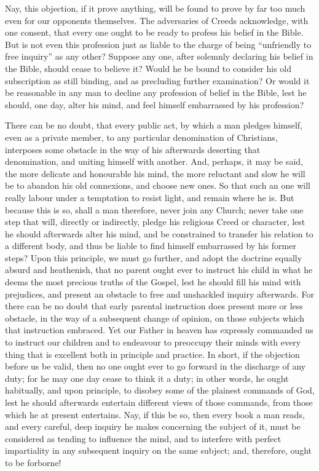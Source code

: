 \documentclass[
]{book}
\begin{document}
Nay, this objection, if it prove anything, will be found to prove by far too much even for our opponents themselves. The adversaries of Creeds acknowledge, with one consent, that every one ought to be ready to profess his belief in the Bible. But is not even this profession just as liable to the charge of being ``unfriendly to free inquiry'' as any other? Suppose any one, after solemnly declaring his belief in the Bible, should cease to believe it? Would he be bound to consider his old subscription as still binding, and as precluding further examination? Or would it be reasonable in any man to decline any profession of belief in the Bible, lest he should, one day, alter his mind, and feel himself embarrassed by his profession?

There can be no doubt, that every public act, by which a man pledges himself, even as a private member, to any particular denomination of Christians, interposes some obstacle in the way of his afterwards deserting that denomination, and uniting himself with another. And, perhaps, it may be said, the more delicate and honourable his mind, the more reluctant and slow he will be to abandon his old connexions, and choose new ones. So that such an one will really labour under a temptation to resist light, and remain where he is. But because this is so, shall a man therefore, never join any Church; never take one step that will, directly or indirectly, pledge his religious Creed or character, lest he should afterwards alter his mind, and be constrained to transfer his relation to a different body, and thus be liable to find himself embarrassed by his former steps? Upon this principle, we must go further, and adopt the doctrine equally absurd and heathenish, that no parent ought ever to instruct his child in what he deems the most precious truths of the Gospel, lest he should fill his mind with prejudices, and present an obstacle to free and unshackled inquiry afterwards. For there can be no doubt that early parental instruction does present more or less obstacle, in the way of a subsequent change of opinion, on those subjects which that instruction embraced. Yet our Father in heaven has expressly commanded us to instruct our children and to endeavour to preoccupy their minds with every thing that is excellent both in principle and practice. In short, if the objection before us be valid, then no one ought ever to go forward in the discharge of any duty; for he may one day cease to think it a duty; in other words, he ought habitually, and upon principle, to disobey some of the plainest commands of God, lest he should afterwards entertain different views of those commands, from those which he at present entertains. Nay, if this be so, then every book a man reads, and every careful, deep inquiry he makes concerning the subject of it, must be considered as tending to influence the mind, and to interfere with perfect impartiality in
any subsequent inquiry on the same subject; and, therefore, ought to be forborne!
\end{document}
